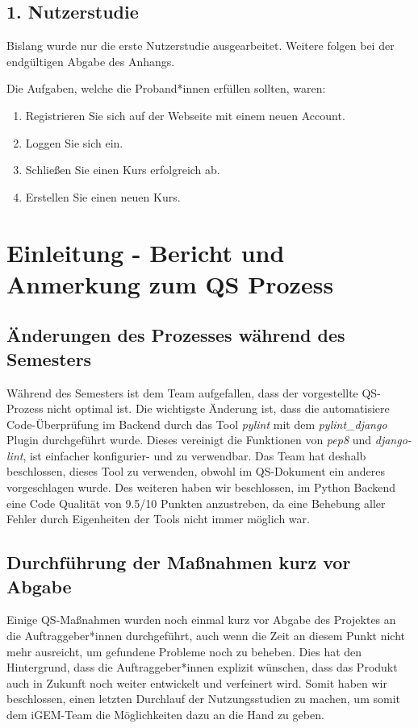 \documentclass[accentcolor=tud0b,12pt,paper=a4]{tudreport}
\begin{document}
\section{1. Nutzerstudie}
Bislang wurde nur die erste Nutzerstudie ausgearbeitet. Weitere folgen bei der endgültigen Abgabe des Anhangs.

Die Aufgaben, welche die Proband*innen erfüllen sollten, waren:
\begin{enumerate}
	\item Registrieren Sie sich auf der Webseite mit einem neuen Account.
	\item Loggen Sie sich ein.
	\item Schließen Sie einen Kurs erfolgreich ab.
	\item Erstellen Sie einen neuen Kurs.
\end{enumerate}
	


\chapter{Einleitung - Bericht und Anmerkung zum QS Prozess}
\section{Änderungen des Prozesses während des Semesters}
Während des Semesters ist dem Team aufgefallen, dass der vorgestellte QS-Prozess nicht optimal ist. Die wichtigste Änderung ist, dass die automatisiere Code-Überprüfung im Backend durch das Tool \emph{pylint} mit dem \emph{pylint\_django} Plugin durchgeführt wurde. Dieses vereinigt die Funktionen von \emph{pep8} und \emph{django-lint}, ist einfacher konfigurier- und zu verwendbar. Das Team hat deshalb beschlossen, dieses Tool zu verwenden, obwohl im QS-Dokument ein anderes vorgeschlagen wurde. Des weiteren haben wir beschlossen, im Python Backend eine Code Qualität von 9.5/10 Punkten anzustreben, da eine Behebung aller Fehler durch Eigenheiten der Tools nicht immer möglich war.

\section{Durchführung der Maßnahmen kurz vor Abgabe}
Einige QS-Maßnahmen wurden noch einmal kurz vor Abgabe des Projektes an die Auftraggeber*innen durchgeführt, auch wenn die Zeit an diesem Punkt nicht mehr ausreicht, um gefundene Probleme noch zu beheben. Dies hat den Hintergrund, dass die Auftraggeber*innen explizit wünschen, dass das Produkt auch in Zukunft noch weiter entwickelt und verfeinert wird. Somit haben wir beschlossen, einen letzten Durchlauf der Nutzungsstudien zu machen, um somit dem iGEM-Team die Möglichkeiten dazu an die Hand zu geben.
\end{document}
